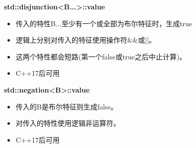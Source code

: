\textbf{std::disjunction<B...>::value}

\begin{itemize}
\item 
传入的特性B...至少有一个或全部为布尔特征时，生成true

\item 
逻辑上分别对传入的特征使用操作符\&\&或||。

\item 
这两个特性都会短路(第一个false或true之后中止计算)。

\item 
C++17后可用
\end{itemize}

\textbf{std::negation<B>::value}

\begin{itemize}
\item 
传入的B是布尔特征则生成false。

\item 
对传入的特性使用逻辑非运算符。

\item 
C++17后可用
\end{itemize}












